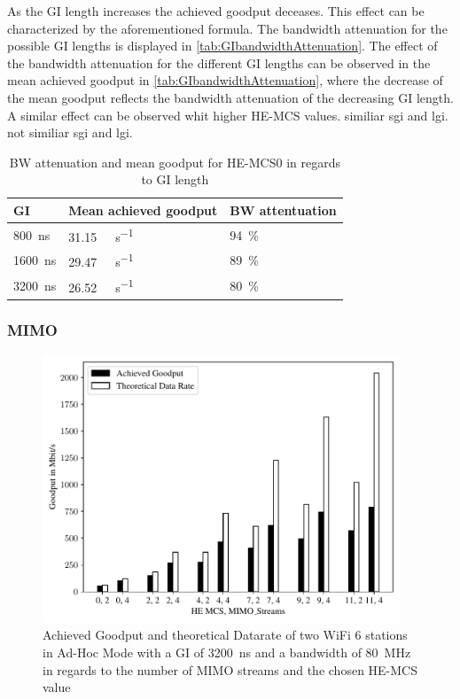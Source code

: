 As the \ac{GI} length increases the achieved goodput deceases. This effect can be characterized by the aforementioned formula.
The bandwidth attenuation for the possible \ac{GI} lengths is displayed in \autoref{tab:GIbandwidthAttenuation}.
The effect of the bandwidth attenuation for the different \ac{GI} lengths can be observed in the mean achieved goodput in
\autoref{tab:GIbandwidthAttenuation}, where the decrease of the mean goodput reflects the bandwidth attenuation of the decreasing \ac{GI} length.
A similar effect can be observed whit higher HE-\ac{MCS} values.
\textcite{Pravinkumar Patil} similiar sgi and lgi.
\textcite{Prasad} not similiar sgi and lgi.
\begin{table}[H]
	\centering
	\begin{tabular}{>{\centering}p{3cm}p{3cm}p{3cm}}
		\toprule
		\ac{GI} & Mean achieved goodput & \ac{BW} attentuation\\
		\midrule
		\SI{800}{\nano\second} & \SI{31.15}{\giga\bit\per\second}&
		\SI{94}{\percent} \\
		\SI{1600}{\nano\second} &
		\SI{29.47}{\giga\bit\per\second}&
		\SI{89}{\percent} \\
		\SI{3200}{\nano\second} & \SI{26.52}{\giga\bit\per\second}&
		\SI{80}{\percent} \\
		\bottomrule
	\end{tabular}
	\caption{\acf{BW} attenuation and mean goodput for HE-\ac{MCS}0 in regards to \acf{GI} length}
	\label{tab:GIbandwidthAttenuation}
\end{table}

\subsubsection*{\acf{MIMO}}

\begin{figure}%
	\centering
	\includegraphics[width=0.95\textwidth]{figures/mimo_dataRate_simulation.pdf}
	\caption{Achieved Goodput and theoretical Datarate of two WiFi 6 stations in Ad-Hoc Mode with a \acf{GI} of \SI{3200}{\nano\second} and a bandwidth of \SI{80}{\mega\hertz} in regards to the number of \acf{MIMO} streams and the chosen HE-\ac{MCS} value}%
	\label{fig:Data_rate_Mimo}%
\end{figure}


